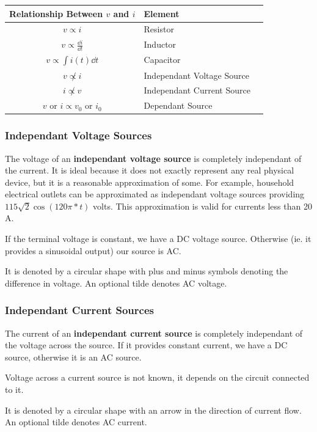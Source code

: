 \documentclass[12pt]{article}
\begin{document}
\begin{table}[ht]
\centering
  \begin{tabular}{clc}
  Relationship Between $v$ and $i$ & Element \\ \hline
  $v \propto i$ & Resistor \\
  $v \propto \frac{\dd i}{\dd t}$ & Inductor \\
  $v \propto \int i(t) \dd t$ & Capacitor \\
  $v \not\propto i$ & Independant Voltage Source \\
  $i \not\propto v$ & Independant Current Source \\
  $v$ or $i \propto v_0$ or $i_0$ & Dependant Source \\ \hline
  \end{tabular}
\end{table}

\subsubsection*{Independant Voltage Sources}
The voltage of an {\bf independant voltage source} is completely independant of the current. It is ideal because it does not exactly represent any real physical device, but it is a reasonable approximation of some. For example, household electrical outlets can be approximated as independant voltage sources providing $115\sqrt{2}\cos(120\pi *t)$ volts. This approximation is valid for currents less than 20 A.

If the terminal voltage is constant, we have a DC voltage source. Otherwise (ie. it provides a sinusoidal output) our source is AC.

It is denoted by a circular shape with plus and minus symbols denoting the difference in voltage. An optional tilde denotes AC voltage.

\subsubsection*{Independant Current Sources}
The current of an {\bf independant current source} is completely independant of the voltage across the source. If it provides constant current, we have a DC source, otherwise it is an AC source.

Voltage across a current source is not known, it depends on the circuit connected to it.

It is denoted by a circular shape with an arrow in the direction of current flow. An optional tilde denotes AC current.
\end{document}
